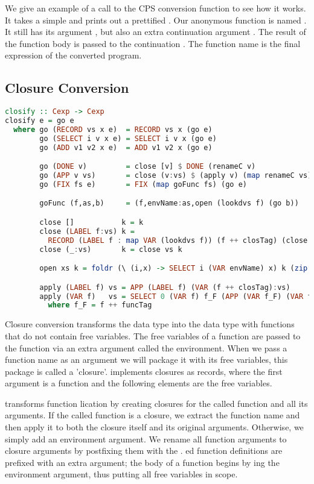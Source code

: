 We give an example of a call to the \ac{CPS} conversion function to see how it works. It takes a simple  and prints out a prettified . Our anonymous function is named . It still has its argument , but also an extra continuation argument . The result of the function body is passed to the continuation . The function name is the final expression of the converted program.

\subsection{\label{section:closconvert}Closure Conversion}
\begin{lstlisting}[language=Haskell]
closify :: Cexp -> Cexp
closify e = go e
  where go (RECORD vs x e)  = RECORD vs x (go e)
        go (SELECT i v x e) = SELECT i v x (go e)
        go (ADD v1 v2 x e)  = ADD v1 v2 x (go e)

        go (DONE v)         = close [v] $ DONE (renameC v)
        go (APP v vs)       = close (v:vs) $ (apply v) (map renameC vs)
        go (FIX fs e)       = FIX (map goFunc fs) (go e)

        goFunc (f,as,b)     = (f,envName:as,open (lookdvs f) (go b))

        close []           k = k
        close (LABEL f:vs) k =
          RECORD (LABEL f : map VAR (lookdvs f)) (f ++ closTag) (close vs k)
        close (_:vs)       k = close vs k

        open xs k = foldr (\ (i,x) -> SELECT i (VAR envName) x) k (zip [1..] xs)

        apply (LABEL f) vs = APP (LABEL f) (VAR (f ++ closTag):vs)
        apply (VAR f)   vs = SELECT 0 (VAR f) f_F (APP (VAR f_F) (VAR f:vs))
          where f_F = f ++ funcTag
\end{lstlisting}

Closure conversion transforms the  data type into the  data type with functions that do not contain free variables. The free variables of a function are passed to the function via an extra argument called the environment. When we pass a function name as an argument we will package it with its free variables, this package is called a 'closure'.  implements closures as records, where the first argument is a function  and the following elements are the free variables.

 transforms function lication by creating closures for the called function and all its arguments. If the called function is a closure, we extract the function name and then apply it to both the closure itself and its original arguments. Otherwise, we simply add an environment argument. We rename all function arguments to closure arguments by postfixing them with the . ed function definitions are prefixed with an extra  argument; the body of a function begins by ing the environment argument, thus putting all free variables in scope.

